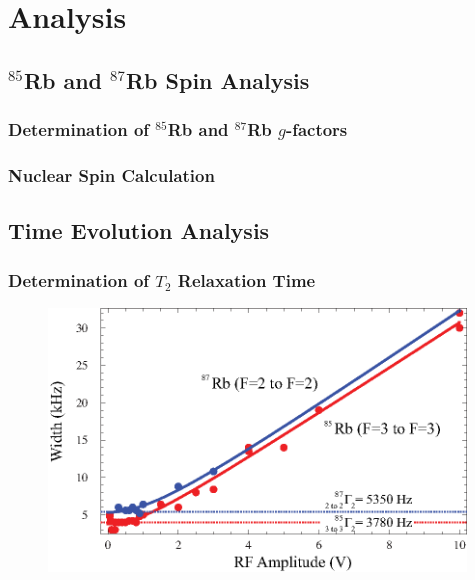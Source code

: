 
\section{Analysis}\label{analysis}

\subsection{$^{85}$Rb and $^{87}$Rb Spin Analysis}

\subsubsection{Determination of $^{85}$Rb and $^{87}$Rb $g$-factors}

\subsubsection{Nuclear Spin Calculation}

\subsection{Time Evolution Analysis}

\subsubsection{Determination of $T_{2}$ Relaxation Time}

\begin{figure}[htbp]
\begin{center}
\includegraphics[height=70mm]{./figures/amp_width.eps}
\caption{\small{}}
\label{fig:}
\end{center}
\end{figure}



